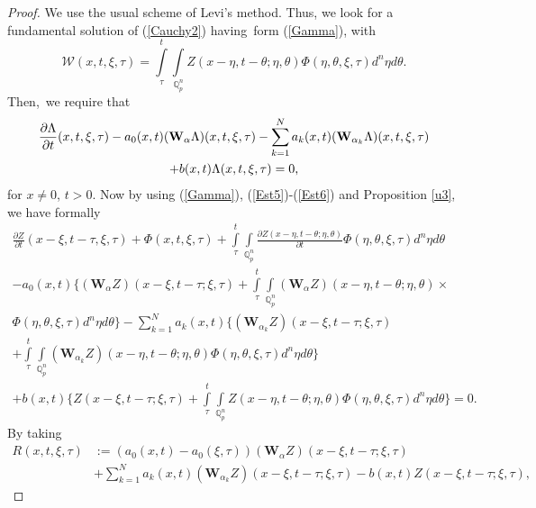 \documentclass{amsart}\usepackage{amsfonts}
\theoremstyle{plain}
\numberwithin{equation}{section}
\begin{document}
\begin{proof}
We use the usual scheme of Levi's method. Thus, we look for a fundamental
solution of (\ref{Cauchy2}) having\ form (\ref{Gamma}), with
\[
\mathcal{W}\left(  x,t,\xi,\tau\right)  ={\displaystyle\int\limits_{\tau}^{t}}
\underset{\mathbb{Q}_{p}^{n}}{\int}Z(x-\eta,t-\theta;\eta,\theta)\Phi
(\eta,\theta,\xi,\tau)d^{n}\eta d\theta.
\]
Then,\ we require that\begin{gather}
\frac{\partial{\LARGE \Lambda}}{\partial t}(x,t,\xi,\tau)-a_{0}(x,t)(\boldsymbol{\mathbf{W}}_{\alpha}{\LARGE \Lambda})(x,t,\xi,\tau
)-\sum_{k=1}^{N}a_{k}(x,t)(\boldsymbol{\mathbf{W}}_{\alpha_{k}}{\LARGE \Lambda
})(x,t,\xi,\tau)\nonumber\\
+b(x,t){\LARGE \Lambda}(x,t,\xi,\tau)=0\text{,} \label{Gamma1}\end{gather}
for $x\neq0$, $t>0$. Now by using (\ref{Gamma}), (\ref{Est5})-(\ref{Est6}) and
Proposition \ref{u3}, we have formally\begin{gather*}
\frac{\partial Z}{\partial t}(x-\xi,t-\tau,\xi,\tau)+\Phi(x,t,\xi,\tau)+{\displaystyle\int\limits_{\tau}^{t}}
\underset{\mathbb{Q}_{p}^{n}}{\int}\frac{\partial Z(x-\eta,t-\theta
;\eta,\theta)}{\partial t}\Phi(\eta,\theta,\xi,\tau)d^{n}\eta d\theta\\
-a_{0}(x,t)\bigl\{(\boldsymbol{\mathbf{W}}_{\alpha}Z)(x-\xi,t-\tau;\xi,\tau)+{\displaystyle\int\limits_{\tau}^{t}}
\underset{\mathbb{Q}_{p}^{n}}{\int}(\boldsymbol{\mathbf{W}}_{\alpha}Z)(x-\eta,t-\theta;\eta,\theta)\times\\
\Phi(\eta,\theta,\xi,\tau)d^{n}\eta d\theta\bigr\}-{\displaystyle\sum\limits_{k=1}^{N}}
a_{k}(x,t)\bigl\{(\boldsymbol{\mathbf{W}}_{\alpha_{k}}Z)(x-\xi,t-\tau;\xi
,\tau)\\
+{\displaystyle\int\limits_{\tau}^{t}}
\underset{\mathbb{Q}_{p}^{n}}{\int}(\boldsymbol{\mathbf{W}}_{\alpha_{k}}Z)(x-\eta,t-\theta;\eta,\theta)\Phi(\eta,\theta,\xi,\tau)d^{n}\eta
d\theta\bigr\}\\
+b(x,t)\bigl\{Z(x-\xi,t-\tau;\xi,\tau)+{\displaystyle\int\limits_{\tau}^{t}}
\underset{\mathbb{Q}_{p}^{n}}{\int}Z(x-\eta,t-\theta;\eta,\theta)\Phi
(\eta,\theta,\xi,\tau)d^{n}\eta d\theta\bigr\}=0.
\end{gather*}
By taking\begin{align*}
R(x,t,\xi,\tau)  &  :=(a_{0}(x,t)-a_{0}(\xi,\tau))(\mathbf{W}_{\alpha}Z)(x-\xi,t-\tau;\xi,\tau)\\
&  +\sum_{k=1}^{N}a_{k}(x,t)(\boldsymbol{\mathbf{W}}_{\alpha_{k}}Z)(x-\xi,t-\tau;\xi,\tau)-b(x,t)Z(x-\xi,t-\tau;\xi,\tau),

\end{align*}
\end{proof}
\end{document}
